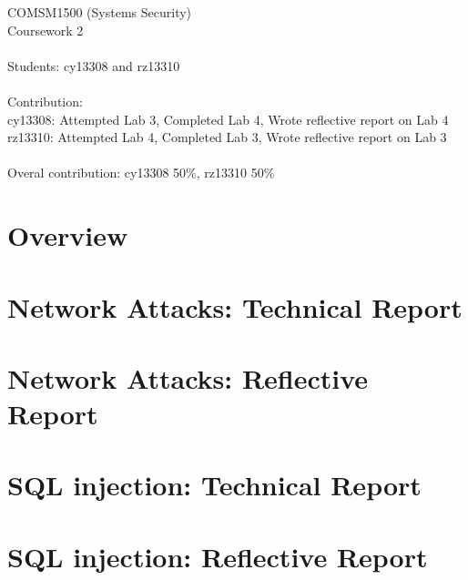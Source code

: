 \documentclass[11pt, onecolumn]{article}
\newcommand\tab[1][1cm]{\hspace*{#1}}
\begin{document}
COMSM1500 (Systems Security)\\
Coursework 2\\
\\
Students: cy13308 and rz13310 \\
\\
Contribution: \\
\tab[1cm] cy13308: Attempted Lab 3, Completed Lab 4, Wrote reflective report on Lab 4\\
\tab[1cm] rz13310: Attempted Lab 4, Completed Lab 3, Wrote reflective report on Lab 3
\\
\\
Overal contribution: cy13308 50\%, rz13310 50\%
\newpage


\section{Overview}


\newpage
\section{Network Attacks: Technical Report}


\newpage
\section{Network Attacks: Reflective Report}


\newpage
\section{SQL injection: Technical Report}


\newpage
\section{SQL injection: Reflective Report}


{}

\end{document}
